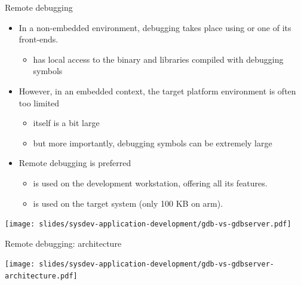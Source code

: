 \begin{frame}{Remote debugging}
  \begin{itemize}
  \item In a non-embedded environment, debugging takes place using 
    or one of its front-ends.
    \begin{itemize}
    \item {} has local access to the binary and libraries compiled
      with debugging symbols
    \end{itemize}
  \item However, in an embedded context, the target platform
    environment is often too limited
    \begin{itemize}
    \item {} itself is a bit large
    \item but more importantly, debugging symbols can be extremely large
    \end{itemize}
  \item Remote debugging is preferred
    \begin{itemize}
    \item {} is used on the development workstation, offering
      all its features.
    \item {} is used on the target system (only 100 KB
      on arm).
    \end{itemize}
  \end{itemize}
  \begin{center}
    \texttt{[image: slides/sysdev-application-development/gdb-vs-gdbserver.pdf]}
  \end{center}
\end{frame}

\begin{frame}{Remote debugging: architecture}
  \begin{center}
    \texttt{[image: slides/sysdev-application-development/gdb-vs-gdbserver-architecture.pdf]}
  \end{center}
\end{frame}

